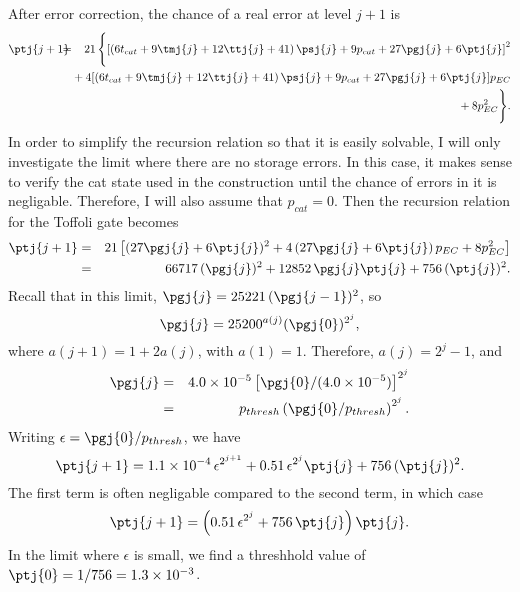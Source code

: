 After error correction, the chance of a real error at level $j+1$ is
\begin{eqnarray}
	\ptj{j+1} & \!\!\!\!\! = & \!\!\!\!\! 21\,\Bigg\{ \!\left[(6 t_{cat} + 9
	\tmj{j} + 12 \ttj{j} + 41)\,\psj{j} + 9 p_{cat} + 27 \pgj{j} + 6
	\ptj{j}\right]^2 \nonumber \nopagebreak \\
	& & \!\!\!\!\!\! \mbox{} + 4 \! \left[ (6 t_{cat} + 9 \tmj{j} + 12 \ttj{j} +
	41)\,\psj{j} + 9 p_{cat} + 27 \pgj{j} + 6 \ptj{j}\right] \! p_{EC} \nonumber
	\nopagebreak \\
	& & \!\!\!\!\!\! \mbox{} + 8 p_{EC}^2 \Bigg\}.
\end{eqnarray}
In order to simplify the recursion relation so that it is easily solvable,
I will only investigate the limit where there are no storage errors.  In
this case, it makes sense to verify the cat state used in the construction
until the chance of errors in it is negligable.  Therefore, I will also
assume that $p_{cat} = 0$.  Then the recursion relation for the Toffoli
gate becomes
\begin{eqnarray}
	\ptj{j+1} & = & 21 \left[ (27 \pgj{j} + 6 \ptj{j})^2 + 4\,(27 \pgj{j} +
	6 \ptj{j})\,p_{EC} + 8 p_{EC}^2 \right] \\
	& = & 66717\,(\pgj{j})^2 + 12852\,\pgj{j} \ptj{j} + 756\,(\ptj{j})^2.
\end{eqnarray}
Recall that in this limit, $\pgj{j} = 25221\,(\pgj{j-1})^2$, so
\begin{equation}
	\pgj{j} = 25200^{a(j)} (\pgj{0})^{2^j},
\end{equation}
where $a(j+1) = 1 + 2a(j)$, with $a(1) = 1$.  Therefore, $a(j) = 2^j - 1$,
and
\begin{eqnarray}
	\pgj{j} & = & 4.0 \times 10^{-5}
	\left[ \pgj{0}/ (4.0 \times 10^{-5}) \right]^{2^j} \\
	& = & p_{thresh} \left( \pgj{0}/p_{thresh} \right)^{2^j}.
\end{eqnarray}
Writing $\epsilon = \pgj{0}/p_{thresh}$, we have
\begin{equation}
	\ptj{j+1} = 1.1 \times 10^{-4}\,\epsilon^{2^{j+1}} + 0.51\,\epsilon^{2^j}
	\ptj{j} + 756\,(\ptj{j})^2.
\end{equation}
The first term is often negligable compared to the second term, in which case
\begin{equation}
	\ptj{j+1} = \left( 0.51\,\epsilon^{2^j} + 756\,\ptj{j} \right) \ptj{j}.
\end{equation}
In the limit where $\epsilon$ is small, we find a threshhold value of
$\ptj{0} = 1/756 = 1.3 \times 10^{-3}$.

